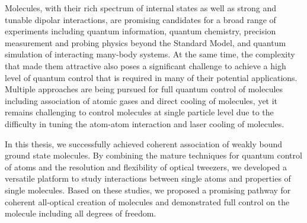 
Molecules, with their rich spectrum of internal states as well as
strong and tunable dipolar interactions, are promising candidates for
a broad range of experiments including quantum information,
quantum chemistry, precision measurement and probing physics beyond the Standard Model,
and quantum simulation of interacting many-body systems.
At the same time, the complexity that made them attractive also poses a significant challenge
to achieve a high level of quantum control that is required in many of
their potential applications.
Multiple approaches are being pursued for full quantum control of molecules
including association of atomic gases and direct cooling of molecules,
yet it remains challenging to control molecules at single particle level
due to the difficulty in tuning the atom-atom interaction
and laser cooling of molecules.

In this thesis, we successfully achieved coherent association of
weakly bound ground state molecules.
By combining the mature techniques for quantum control of atoms
and the resolution and flexibility of optical tweezers,
we developed a versatile platform to study interactions between single atoms
and properties of single molecules.
Based on these studies, we proposed a promising pathway
for coherent all-optical creation of molecules
and demonstrated full control on the molecule including all degrees of freedom.

